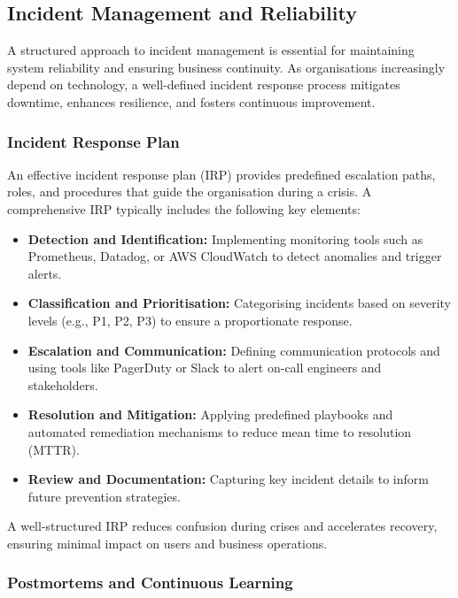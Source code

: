 \subsection{Incident Management and Reliability}

A structured approach to incident management is essential for maintaining system reliability and ensuring business continuity. As organisations increasingly depend on technology, a well-defined incident response process mitigates downtime, enhances resilience, and fosters continuous improvement.

\subsubsection{Incident Response Plan}

An effective incident response plan (IRP) provides predefined escalation paths, roles, and procedures that guide the organisation during a crisis. A comprehensive IRP typically includes the following key elements:

\begin{itemize}
    \item \textbf{Detection and Identification:} Implementing monitoring tools such as Prometheus, Datadog, or AWS CloudWatch to detect anomalies and trigger alerts.
    \item \textbf{Classification and Prioritisation:} Categorising incidents based on severity levels (e.g., P1, P2, P3) to ensure a proportionate response.
    \item \textbf{Escalation and Communication:} Defining communication protocols and using tools like PagerDuty or Slack to alert on-call engineers and stakeholders.
    \item \textbf{Resolution and Mitigation:} Applying predefined playbooks and automated remediation mechanisms to reduce mean time to resolution (MTTR).
    \item \textbf{Review and Documentation:} Capturing key incident details to inform future prevention strategies.
\end{itemize}

A well-structured IRP reduces confusion during crises and accelerates recovery, ensuring minimal impact on users and business operations.

\subsubsection{Postmortems and Continuous Learning}

